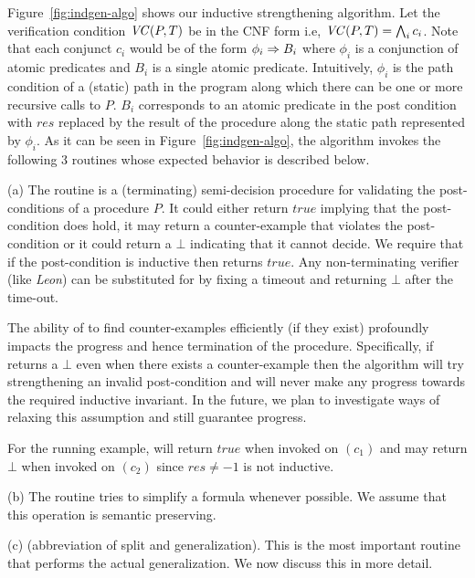 Figure~\ref{fig:indgen-algo} shows our inductive strengthening algorithm.
Let the verification condition $\mathit{VC}(P,T)$ be in the CNF form i.e, 
$\mathit{VC}(P,T) = \bigwedge_i c_i$. 
Note that each conjunct $c_i$ would be of the form $\phi_i \Rightarrow B_i$  
where $\phi_i$ is a conjunction of atomic predicates and $B_i$ is a single atomic predicate.
Intuitively, $\phi_i$ is the path condition of a (static) path in the 
program along which there can be one or more recursive calls to $P$.
$B_i$ corresponds to an atomic predicate in the post condition with $res$ replaced
by the result of the procedure along the static path represented by $\phi_i$.
As it can be seen in Figure~\ref{fig:indgen-algo}, the algorithm invokes the following 3 routines 
whose expected behavior is described below.

(a) The routine \SDecide is a (terminating) semi-decision procedure for validating the post-conditions
of a procedure $P$. It could either return $true$ implying that the post-condition does hold, it may return
a counter-example that violates the post-condition or it could return a $\bot$ indicating that it cannot 
decide. We require that if the post-condition is inductive then \SDecide returns $true$. 
Any non-terminating verifier (like \textit{Leon}) can be substituted for \SDecide by fixing a timeout 
and returning $\bot$ after the time-out.

The ability of \SDecide to find counter-examples efficiently (if they exist)
profoundly impacts the progress and hence termination of the \IndGen procedure.
Specifically, if \SDecide returns a $\bot$ even when there exists a counter-example 
then the algorithm will try strengthening an invalid post-condition and will never make any
progress towards the required inductive invariant.
In the future, we plan to investigate ways of relaxing this assumption and still guarantee progress.

For the running example, \SDecide will return $true$ when invoked on $(c_1)$ and 
may return $\bot$ when invoked on $(c_2)$ since $res \ne -1$ is not inductive.

(b) The \Simplify routine tries to simplify a formula whenever possible. We assume that this operation is 
semantic preserving.

(c) \SG (abbreviation of split and generalization). This is the most important 
routine that performs the actual generalization. We now discuss this in more detail.